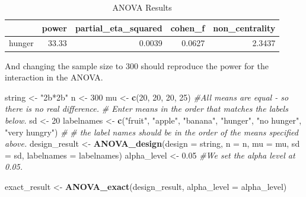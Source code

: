 \documentclass[]{book}
\newenvironment{Shaded}{\begin{snugshade}}{\end{snugshade}}
\newcommand{\CommentTok}[1]{\textcolor[rgb]{0.56,0.35,0.01}{\textit{#1}}}
\newcommand{\DataTypeTok}[1]{\textcolor[rgb]{0.13,0.29,0.53}{#1}}
\newcommand{\DecValTok}[1]{\textcolor[rgb]{0.00,0.00,0.81}{#1}}
\newcommand{\FloatTok}[1]{\textcolor[rgb]{0.00,0.00,0.81}{#1}}
\newcommand{\KeywordTok}[1]{\textcolor[rgb]{0.13,0.29,0.53}{\textbf{#1}}}
\newcommand{\NormalTok}[1]{#1}
\newcommand{\StringTok}[1]{\textcolor[rgb]{0.31,0.60,0.02}{#1}}
\begin{document}
\begin{table}[t]

\caption{\label{tab:unnamed-chunk-163}ANOVA Results}
\centering
\begin{tabular}{l|r|r|r|r}
\hline
  & power & partial\_eta\_squared & cohen\_f & non\_centrality\\
\hline
hunger & 33.33 & 0.0039 & 0.0627 & 2.3437\\
\hline
\end{tabular}
\end{table}

And changing the sample size to 300 should reproduce the power for the interaction in the ANOVA.

\begin{Shaded}
\begin{Highlighting}[]
\NormalTok{string <-}\StringTok{ "2b*2b"}
\NormalTok{n <-}\StringTok{ }\DecValTok{300}
\NormalTok{mu <-}\StringTok{ }\KeywordTok{c}\NormalTok{(}\DecValTok{20}\NormalTok{, }\DecValTok{20}\NormalTok{, }\DecValTok{20}\NormalTok{, }\DecValTok{25}\NormalTok{) }\CommentTok{#All means are equal - so there is no real difference.}
\CommentTok{# Enter means in the order that matches the labels below.}
\NormalTok{sd <-}\StringTok{ }\DecValTok{20}
\NormalTok{labelnames <-}\StringTok{ }\KeywordTok{c}\NormalTok{(}\StringTok{"fruit"}\NormalTok{, }\StringTok{"apple"}\NormalTok{, }\StringTok{"banana"}\NormalTok{, }
                \StringTok{"hunger"}\NormalTok{, }\StringTok{"no hunger"}\NormalTok{, }\StringTok{"very hungry"}\NormalTok{) }\CommentTok{#}
\CommentTok{# the label names should be in the order of the means specified above.}
\NormalTok{design_result <-}\StringTok{ }\KeywordTok{ANOVA_design}\NormalTok{(}\DataTypeTok{design =}\NormalTok{ string,}
                   \DataTypeTok{n =}\NormalTok{ n, }
                   \DataTypeTok{mu =}\NormalTok{ mu, }
                   \DataTypeTok{sd =}\NormalTok{ sd, }
                   \DataTypeTok{labelnames =}\NormalTok{ labelnames)}
\NormalTok{alpha_level <-}\StringTok{ }\FloatTok{0.05} \CommentTok{#We set the alpha level at 0.05. }

\NormalTok{exact_result <-}\StringTok{ }\KeywordTok{ANOVA_exact}\NormalTok{(design_result, }\DataTypeTok{alpha_level =}\NormalTok{ alpha_level)}
\end{Highlighting}
\end{Shaded}
\end{document}
